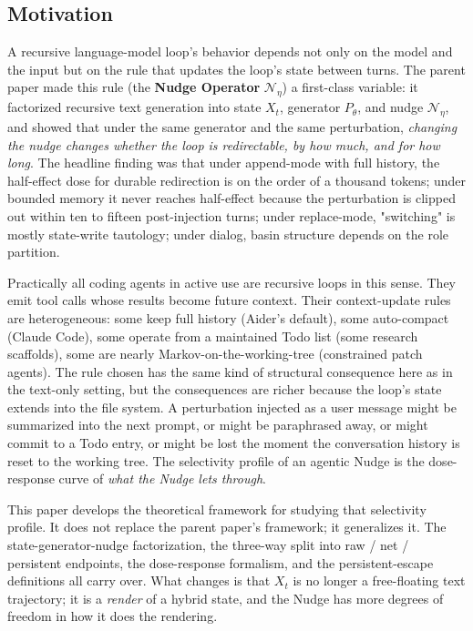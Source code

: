 \documentclass{article}
\theoremstyle{plain}
\theoremstyle{definition}
\begin{document}
\subsection{Motivation}

A recursive language-model loop's behavior depends not only on the model and the input but on the rule that updates the loop's state between turns. The parent paper made this rule (the \textbf{Nudge Operator} $\mathcal{N}_\eta$) a first-class variable: it factorized recursive text generation into state $X_t$, generator $P_\theta$, and nudge $\mathcal{N}_\eta$, and showed that under the same generator and the same perturbation, \textit{changing the nudge changes whether the loop is redirectable, by how much, and for how long}. The headline finding was that under append-mode with full history, the half-effect dose for durable redirection is on the order of a thousand tokens; under bounded memory it never reaches half-effect because the perturbation is clipped out within ten to fifteen post-injection turns; under replace-mode, "switching" is mostly state-write tautology; under dialog, basin structure depends on the role partition.

Practically all coding agents in active use are recursive loops in this sense. They emit tool calls whose results become future context. Their context-update rules are heterogeneous: some keep full history (Aider's default), some auto-compact (Claude Code), some operate from a maintained Todo list (some research scaffolds), some are nearly Markov-on-the-working-tree (constrained patch agents). The rule chosen has the same kind of structural consequence here as in the text-only setting, but the consequences are richer because the loop's state extends into the file system. A perturbation injected as a user message might be summarized into the next prompt, or might be paraphrased away, or might commit to a Todo entry, or might be lost the moment the conversation history is reset to the working tree. The selectivity profile of an agentic Nudge is the dose-response curve of \textit{what the Nudge lets through}.

This paper develops the theoretical framework for studying that selectivity profile. It does not replace the parent paper's framework; it generalizes it. The state-generator-nudge factorization, the three-way split into raw / net / persistent endpoints, the dose-response formalism, and the persistent-escape definitions all carry over. What changes is that $X_t$ is no longer a free-floating text trajectory; it is a \textit{render} of a hybrid state, and the Nudge has more degrees of freedom in how it does the rendering.
\end{document}
